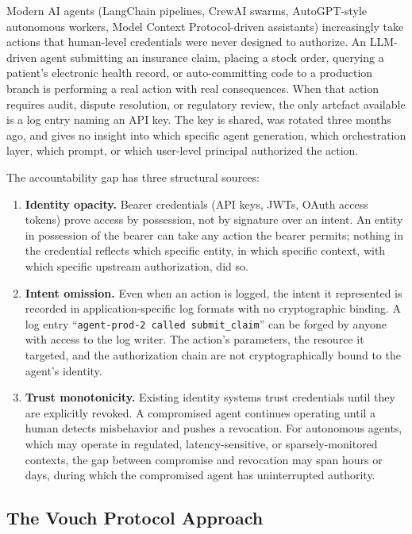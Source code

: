 \documentclass[11pt,a4paper]{article}
\begin{document}
Modern AI agents (LangChain pipelines, CrewAI swarms, AutoGPT-style autonomous workers, Model Context Protocol-driven assistants) increasingly take actions that human-level credentials were never designed to authorize. An LLM-driven agent submitting an insurance claim, placing a stock order, querying a patient's electronic health record, or auto-committing code to a production branch is performing a real action with real consequences. When that action requires audit, dispute resolution, or regulatory review, the only artefact available is a log entry naming an API key. The key is shared, was rotated three months ago, and gives no insight into which specific agent generation, which orchestration layer, which prompt, or which user-level principal authorized the action.

The accountability gap has three structural sources:

\begin{enumerate}[label=\textbf{\arabic*.},leftmargin=*]
\item \textbf{Identity opacity.} Bearer credentials (API keys, JWTs, OAuth access tokens) prove access by possession, not by signature over an intent. An entity in possession of the bearer can take any action the bearer permits; nothing in the credential reflects which specific entity, in which specific context, with which specific upstream authorization, did so.

\item \textbf{Intent omission.} Even when an action is logged, the intent it represented is recorded in application-specific log formats with no cryptographic binding. A log entry ``\texttt{agent-prod-2 called submit\_claim}'' can be forged by anyone with access to the log writer. The action's parameters, the resource it targeted, and the authorization chain are not cryptographically bound to the agent's identity.

\item \textbf{Trust monotonicity.} Existing identity systems trust credentials until they are explicitly revoked. A compromised agent continues operating until a human detects misbehavior and pushes a revocation. For autonomous agents, which may operate in regulated, latency-sensitive, or sparsely-monitored contexts, the gap between compromise and revocation may span hours or days, during which the compromised agent has uninterrupted authority.
\end{enumerate}

\subsection{The Vouch Protocol Approach}
\end{document}

